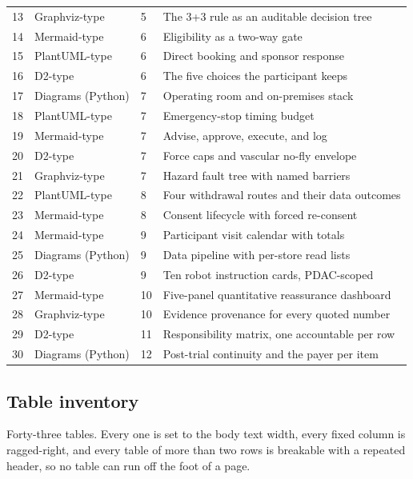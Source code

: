 \begin{xltabular}{\textwidth}{C{1.0cm} L{3.6cm} C{1.0cm} Y}
13 & Graphviz-type & 5 & The 3+3 rule as an auditable decision tree \\
14 & Mermaid-type & 6 & Eligibility as a two-way gate \\
15 & PlantUML-type & 6 & Direct booking and sponsor response \\
16 & D2-type & 6 & The five choices the participant keeps \\
17 & Diagrams (Python) & 7 & Operating room and on-premises stack \\
18 & PlantUML-type & 7 & Emergency-stop timing budget \\
19 & Mermaid-type & 7 & Advise, approve, execute, and log \\
20 & D2-type & 7 & Force caps and vascular no-fly envelope \\
21 & Graphviz-type & 7 & Hazard fault tree with named barriers \\
22 & PlantUML-type & 8 & Four withdrawal routes and their data outcomes \\
23 & Mermaid-type & 8 & Consent lifecycle with forced re-consent \\
24 & Mermaid-type & 9 & Participant visit calendar with totals \\
25 & Diagrams (Python) & 9 & Data pipeline with per-store read lists \\
26 & D2-type & 9 & Ten robot instruction cards, PDAC-scoped \\
27 & Mermaid-type & 10 & Five-panel quantitative reassurance dashboard \\
28 & Graphviz-type & 10 & Evidence provenance for every quoted number \\
29 & D2-type & 11 & Responsibility matrix, one accountable per row \\
30 & Diagrams (Python) & 12 & Post-trial continuity and the payer per item \\
\end{xltabular}

\vspace{0.30em}

\subsection{Table inventory}

Forty-three tables. Every one is set to the body text width, every fixed column
is ragged-right, and every table of more than two rows is breakable with a
repeated header, so no table can run off the foot of a page.

